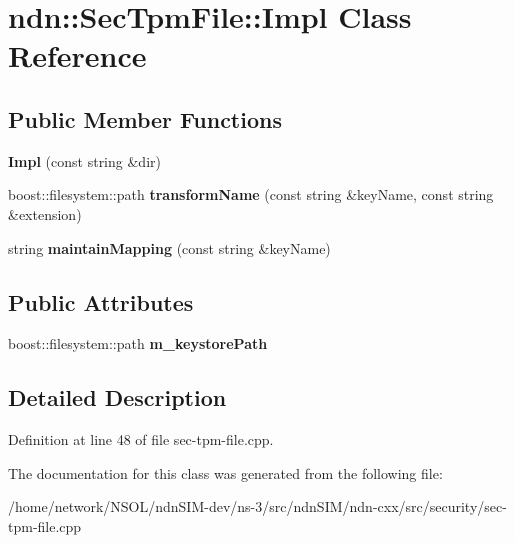 \hypertarget{classndn_1_1SecTpmFile_1_1Impl}{}\section{ndn\+:\+:Sec\+Tpm\+File\+:\+:Impl Class Reference}
\label{classndn_1_1SecTpmFile_1_1Impl}
\subsection*{Public Member Functions}
\begin{DoxyCompactItemize}
\item 
{\bfseries Impl} (const string \&dir)\hypertarget{classndn_1_1SecTpmFile_1_1Impl_aeb564f9062467f31e1ee806a6599a55c}{}\label{classndn_1_1SecTpmFile_1_1Impl_aeb564f9062467f31e1ee806a6599a55c}

\item 
boost\+::filesystem\+::path {\bfseries transform\+Name} (const string \&key\+Name, const string \&extension)\hypertarget{classndn_1_1SecTpmFile_1_1Impl_a9ced232c5648f04f9af604ff6217fb61}{}\label{classndn_1_1SecTpmFile_1_1Impl_a9ced232c5648f04f9af604ff6217fb61}

\item 
string {\bfseries maintain\+Mapping} (const string \&key\+Name)\hypertarget{classndn_1_1SecTpmFile_1_1Impl_a206306cf95d7c0063474b8781f0feeea}{}\label{classndn_1_1SecTpmFile_1_1Impl_a206306cf95d7c0063474b8781f0feeea}

\end{DoxyCompactItemize}
\subsection*{Public Attributes}
\begin{DoxyCompactItemize}
\item 
boost\+::filesystem\+::path {\bfseries m\+\_\+keystore\+Path}\hypertarget{classndn_1_1SecTpmFile_1_1Impl_a0dd3f97128a59dd860dd65d9e5dadb62}{}\label{classndn_1_1SecTpmFile_1_1Impl_a0dd3f97128a59dd860dd65d9e5dadb62}

\end{DoxyCompactItemize}


\subsection{Detailed Description}


Definition at line 48 of file sec-\/tpm-\/file.\+cpp.



The documentation for this class was generated from the following file\+:\begin{DoxyCompactItemize}
\item 
/home/network/\+N\+S\+O\+L/ndn\+S\+I\+M-\/dev/ns-\/3/src/ndn\+S\+I\+M/ndn-\/cxx/src/security/sec-\/tpm-\/file.\+cpp\end{DoxyCompactItemize}
